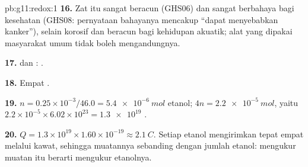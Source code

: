 \begin{solution}{pb:g11:redox:1}
\textbf{16.} Zat itu sangat beracun (GHS06) dan sangat berbahaya bagi
kesehatan (GHS08: pernyataan bahayanya mencakup ``dapat menyebabkan
kanker''), selain korosif dan beracun bagi kehidupan akuatik; alat yang
dipakai masyarakat umum tidak boleh mengandungnya.

\textbf{17.}  dan
:
.

\textbf{18.} Empat .

\textbf{19.} $n = 0.25\times 10^{-3}/46.0 = \qty{5.4e-6}{mol}$
etanol;  $4n = \qty{2.2e-5}{mol}$, yaitu
$2.2\times 10^{-5}\times 6.02\times 10^{23} = \num{1.3e19}$ .

\textbf{20.} $Q = 1.3\times 10^{19}\times 1.60\times 10^{-19} \approx
\qty{2.1}{C}$. Setiap  etanol mengirimkan tepat empat 
melalui kawat, sehingga muatannya sebanding dengan jumlah etanol:
mengukur muatan itu berarti mengukur etanolnya.
\end{solution}
